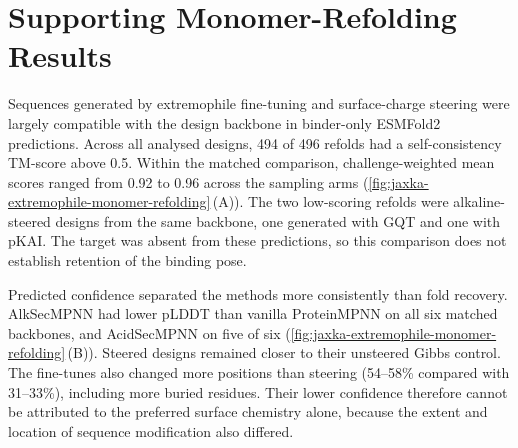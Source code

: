 \section{Supporting Monomer-Refolding Results}
\label{app:jaxka-design-results}

Sequences generated by extremophile fine-tuning and surface-charge steering were largely compatible with the design backbone in binder-only ESMFold2 predictions. Across all analysed designs, 494 of 496 refolds had a self-consistency TM-score above 0.5. Within the matched comparison, challenge-weighted mean scores ranged from 0.92 to 0.96 across the sampling arms (\cref{fig:jaxka-extremophile-monomer-refolding}\,(A)). The two low-scoring refolds were alkaline-steered designs from the same backbone, one generated with GQT and one with pKAI. The target was absent from these predictions, so this comparison does not establish retention of the binding pose.

Predicted confidence separated the methods more consistently than fold recovery. AlkSecMPNN had lower pLDDT than vanilla ProteinMPNN on all six matched backbones, and AcidSecMPNN on five of six (\cref{fig:jaxka-extremophile-monomer-refolding}\,(B)). Steered designs remained closer to their unsteered Gibbs control. The fine-tunes also changed more positions than steering (54--58\% compared with 31--33\%), including more buried residues. Their lower confidence therefore cannot be attributed to the preferred surface chemistry alone, because the extent and location of sequence modification also differed.


